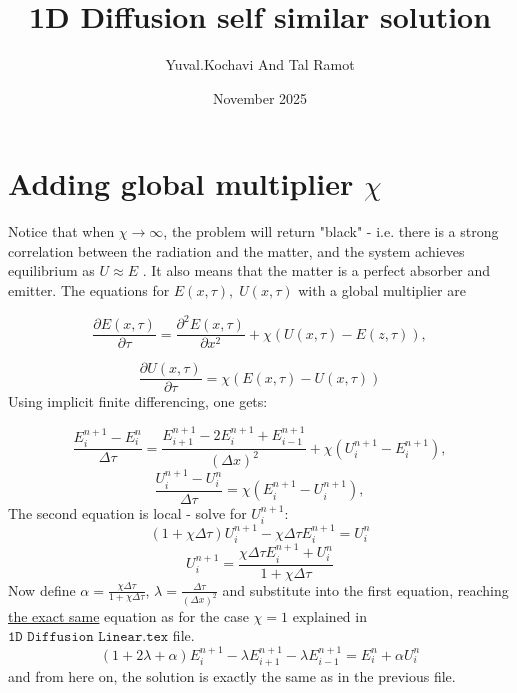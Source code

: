 \documentclass{article}
\title{1D Diffusion self similar solution}
\author{Yuval.Kochavi And Tal Ramot}
\date{November 2025}
\begin{document}
\maketitle

\section{Adding global multiplier $\chi$ }
Notice that when $\chi\to \infty$, the problem will return "black" - i.e. there is a strong correlation between the radiation and the matter, and the system achieves equilibrium as $U\approx E$ . It also means that the matter is a perfect absorber and emitter. 
The equations for $E(x,\tau),\;U(x,\tau)$ with a global multiplier are

\begin{equation}
\frac{\partial E(x,\tau)}{\partial \tau} =\frac{\partial^2E(x,\tau)}{\partial x^2} + \chi(U(x,\tau) - E(z,\tau)),
\end{equation}

\begin{equation}
\frac{\partial U(x,\tau)}{\partial \tau} =\chi( E(x,\tau) - U(x,\tau))
\end{equation}
Using implicit finite differencing, one gets:

\begin{equation}
\frac{E_i^{n+1} - E_i^n}{\Delta \tau} = \frac{E_{i+1}^{n+1} - 2E_i^{n+1} + E_{i-1}^{n+1}}{(\Delta x)^2} + \chi(U_i^{n+1} - E_i^{n+1}),
\end{equation}
\begin{equation}
\frac{U_i^{n+1} - U_i^n}{\Delta \tau} = \chi(E_i^{n+1} - U_i^{n+1}),
\end{equation}
The second equation is local - solve for $U_i^{n+1}$:
\begin{equation}
    (1+\chi\Delta \tau) U_i^{n+1} - \chi \Delta \tau E_i^{n+1} = U_i^n
\end{equation}
\begin{equation}
    U_i^{n+1} = \frac{\chi\Delta \tau E_i^{n+1} + U_i^n}{1+\chi\Delta \tau}
\end{equation}
Now define $\alpha = \frac{\chi\Delta \tau}{1+\chi\Delta \tau}$, $\lambda = \frac{\Delta \tau}{(\Delta x)^2}$ and substitute into the first equation, reaching \underline{the exact same} equation as for the case $\chi=1$
explained in $\texttt{1D Diffusion Linear.tex}$ file.
\begin{equation}
(1+2\lambda+\alpha) E_i^{n+1} - \lambda E_{i+1}^{n+1} - \lambda E_{i-1}^{n+1} = E_i^n + \alpha U_i^n
\end{equation}
and from here on, the solution is exactly the same as in the previous file.
\end{document}
